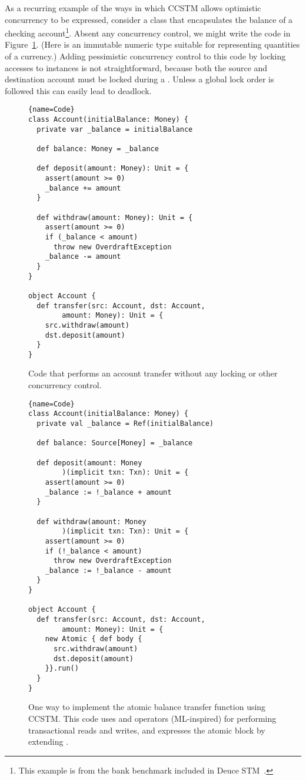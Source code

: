As a recurring example of the ways in which CCSTM allows optimistic concurrency
to be expressed, consider a class that encapsulates the balance of a
checking account\footnote{This example is from the bank benchmark included
in Deuce STM~\cite{deucestm}.}.  Absent any concurrency control, we might
write the code in Figure~\ref{fig:example:nosync}.  (Here 
is an immutable numeric type suitable for representing quantities of
a currency.)  Adding pessimistic concurrency control to this code by
locking accesses to  instances is not straightforward,
because both the source and destination account must be locked during
a .  Unless a global lock order is followed this can
easily lead to deadlock.

\begin{figure}
\begin{lstlisting}{name=Code}
class Account(initialBalance: Money) {
  private var _balance = initialBalance

  def balance: Money = _balance

  def deposit(amount: Money): Unit = {
    assert(amount >= 0)
    _balance += amount
  }

  def withdraw(amount: Money): Unit = {
    assert(amount >= 0)
    if (_balance < amount)
      throw new OverdraftException
    _balance -= amount
  }
}

object Account {
  def transfer(src: Account, dst: Account,
        amount: Money): Unit = {
    src.withdraw(amount)
    dst.deposit(amount)
  }
}
\end{lstlisting}

\caption{Code that performs an account transfer without
any locking or other concurrency control.}

\label{fig:example:nosync}
\end{figure}

\begin{figure}
\begin{lstlisting}{name=Code}
class Account(initialBalance: Money) {
  private val _balance = Ref(initialBalance)

  def balance: Source[Money] = _balance

  def deposit(amount: Money
        )(implicit txn: Txn): Unit = {
    assert(amount >= 0)
    _balance := !_balance + amount
  }

  def withdraw(amount: Money
        )(implicit txn: Txn): Unit = {
    assert(amount >= 0)
    if (!_balance < amount)
      throw new OverdraftException
    _balance := !_balance - amount
  }
}

object Account {
  def transfer(src: Account, dst: Account,
        amount: Money): Unit = {
    new Atomic { def body {
      src.withdraw(amount)
      dst.deposit(amount)
    }}.run()
  }
}
\end{lstlisting}

\caption{One way to implement the atomic balance transfer function
using CCSTM.  This code uses  and \code{:=} operators
(ML-inspired) for performing transactional reads and writes, and
expresses the atomic block by extending .}

\label{fig:example:ccstm}
\end{figure}

